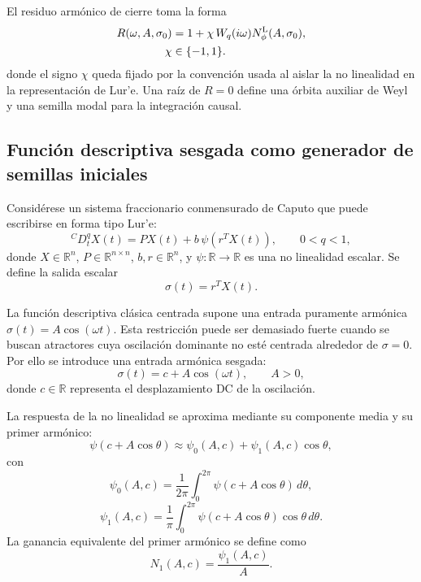 \documentclass[journal]{IEEEtran}
\begin{document}
El residuo armónico de cierre toma la forma
\begin{equation}
\label{eq:lure_residual_theory}
\begin{aligned}
R(\omega, A, \sigma_0)
&=1+\chi\,W_q(i\omega) N_{\phi}^{\rm L}(A,\sigma_0),\\
\chi&\in\{-1,1\}.
\end{aligned}
\end{equation}
donde el signo \(\chi\) queda fijado por la convención usada al aislar la no linealidad en la representación de Lur'e. Una raíz de \(R = 0\) define una órbita auxiliar de Weyl y una semilla modal para la integración causal.

\subsection{Funci\'{o}n descriptiva sesgada como generador de semillas iniciales}
\label{subsec:biased_describing_function}

Consid\'{e}rese un sistema fraccionario conmensurado de Caputo que puede escribirse
en forma tipo Lur'e:
\begin{equation}
{}^C D_t^q X(t)=PX(t)+b\,\psi(r^T X(t)),
\qquad 0<q<1,
\label{eq:lure_frac_bdf}
\end{equation}
donde \(X\in\mathbb{R}^n\), \(P\in\mathbb{R}^{n\times n}\),
\(b,r\in\mathbb{R}^n\), y \(\psi:\mathbb{R}\to\mathbb{R}\) es una no linealidad
escalar. Se define la salida escalar
\begin{equation}
\sigma(t)=r^T X(t).
\end{equation}

La funci\'{o}n descriptiva cl\'{a}sica centrada supone una entrada puramente arm\'{o}nica
\(\sigma(t)=A\cos(\omega t)\). Esta restricci\'{o}n puede ser demasiado fuerte
cuando se buscan atractores cuya oscilaci\'{o}n dominante no est\'{e} centrada alrededor
de \(\sigma=0\). Por ello se introduce una entrada arm\'{o}nica sesgada:
\begin{equation}
\sigma(t)=c+A\cos(\omega t),
\qquad A>0,
\label{eq:biased_ansatz}
\end{equation}
donde \(c\in\mathbb{R}\) representa el desplazamiento DC de la oscilaci\'{o}n.

La respuesta de la no linealidad se aproxima mediante su componente media y su
primer arm\'{o}nico:
\begin{equation}
\psi(c+A\cos\theta)
\approx
\psi_0(A,c)+\psi_1(A,c)\cos\theta,
\label{eq:bdf_first_harmonic}
\end{equation}
con
\begin{equation}
\psi_0(A,c)
=
\frac{1}{2\pi}
\int_0^{2\pi}
\psi(c+A\cos\theta)\,d\theta,
\label{eq:psi0_bdf}
\end{equation}
\begin{equation}
\psi_1(A,c)
=
\frac{1}{\pi}
\int_0^{2\pi}
\psi(c+A\cos\theta)\cos\theta\,d\theta.
\label{eq:psi1_bdf}
\end{equation}
La ganancia equivalente del primer arm\'{o}nico se define como
\begin{equation}
N_1(A,c)=\frac{\psi_1(A,c)}{A}.
\label{eq:N1_bdf}
\end{equation}
\end{document}
